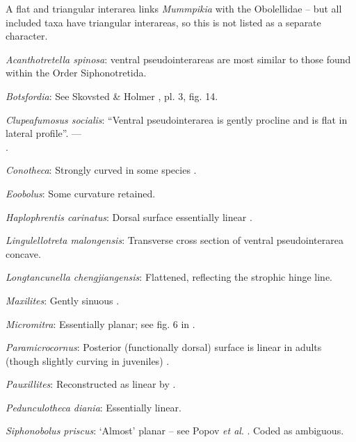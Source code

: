 \documentclass[openany]{book}
\begin{document}
A flat and triangular interarea links \emph{Mummpikia} with the
Obolellidae \citep{Balthasar2008iMummpikia} -- but all included taxa
have triangular interareas, so this is not listed as a separate
character.

\hypertarget{Acanthotretella_spinosa-coding-109}{}
\emph{Acanthotretella spinosa}: ventral pseudointerareas are most
similar to those found within the Order Siphonotretida.

\hypertarget{Botsfordia-coding-109}{}
\emph{Botsfordia}: See Skovsted \& Holmer
\citeyearpar{Skovsted2005EarlyCambrian}, pl. 3, fig. 14.

\hypertarget{Clupeafumosus_socialis-coding-109}{}
\emph{Clupeafumosus socialis}: ``Ventral pseudointerarea is gently
procline and is flat in lateral profile''. ---\\
\citep{Topper2013Reappraisalof}.

\hypertarget{Conotheca-coding-109}{}
\emph{Conotheca}: Strongly curved in some species \citep{Wrona2003}.

\hypertarget{Eoobolus-coding-109}{}
\emph{Eoobolus}: Some curvature retained.

\hypertarget{Haplophrentis_carinatus-coding-109}{}
\emph{Haplophrentis carinatus}: Dorsal surface essentially linear
\citep[fig ed6a, ed7a]{Moysiuk2017Hyolithsare}.

\hypertarget{Lingulellotreta_malongensis-coding-109}{}
\emph{Lingulellotreta malongensis}: Transverse cross section of ventral
pseudointerarea concave.

\hypertarget{Longtancunella_chengjiangensis-coding-109}{}
\emph{Longtancunella chengjiangensis}: Flattened, reflecting the
strophic hinge line.

\hypertarget{Maxilites-coding-109}{}
\emph{Maxilites}: Gently sinuous \citep{MartiMus2005}.

\hypertarget{Micromitra-coding-109}{}
\emph{Micromitra}: Essentially planar; see fig. 6 in
\citet{Ushatinskaya2016Protegulumand}.

\hypertarget{Paramicrocornus-coding-109}{}
\emph{Paramicrocornus}: Posterior (functionally dorsal) surface is
linear in adults (though slightly curving in juveniles)
\citep{Zhang2018Ahyolithid}.

\hypertarget{Pauxillites-coding-109}{}
\emph{Pauxillites}: Reconstructed as linear by \citet{Marek1976}.

\hypertarget{Pedunculotheca_diania-coding-109}{}
\emph{Pedunculotheca diania}: Essentially linear.

\hypertarget{Siphonobolus_priscus-coding-109}{}
\emph{Siphonobolus priscus}: `Almost' planar -- see Popov \emph{et al}.
\citeyearpar[fig. 4]{Popov2009Earlyontogeny}. Coded as ambiguous.
\end{document}
